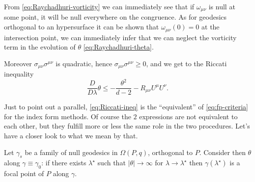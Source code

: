 	From \eqref{eq:Raychadhuri-vorticity} we can immediately see that if \(\omega_{\mu\nu}\) is null at some point, it will be null everywhere on the congruence. As for geodesics orthogonal to an hypersurface it can be shown that \(\omega_{\mu\nu}(0) = 0\) at the intersection point, we can immediately infer that we can neglect the vorticity term in the evolution of \(\theta\) \eqref{eq:Raychadhuri-theta}.
	
	\noindent Moreover \(\sigma_{\mu\nu}\sigma^{\mu\nu}\) is quadratic, hence \(\sigma_{\mu\nu}\sigma^{\mu\nu} \ge 0\), and we get to the Riccati inequality
	\begin{equation}
		\label{eq:Riccati-ineq}
		\frac{D}{D\lambda}\theta \le -\frac{\theta^2}{d - 2} - R_{\mu\nu}U^{\mu}U^{\nu}.
	\end{equation}
	
	Just to point out a parallel, \eqref{eq:Riccati-ineq} is the ``equivalent'' of \eqref{eq:fp-criteria} for the index form methods. Of course the \(2\) expressions are not equivalent to each other, but they fulfill more or less the same role in the two procedures. Let's have a closer look to what we mean by that.
	
	\begin{prop}
		\label{prop:fp-criteria-Raychaudhuri}
		Let \(\gamma_s\) be a family of null geodesics in \(\Omega(P,q)\), orthogonal to \(P\). Consider then \(\theta\) along \(\gamma \equiv \gamma_0\): if there exists \(\lambda^{\star}\) such that \(\vert\theta\vert \rightarrow \infty\) for \(\lambda \rightarrow \lambda^{\star}\) then \(\gamma(\lambda^{\star})\) is a focal point of \(P\) along \(\gamma\).
	\end{prop}

